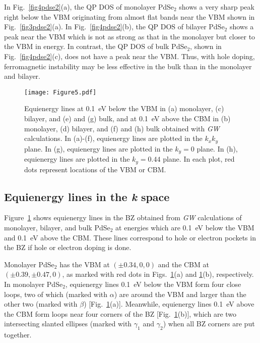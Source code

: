 \documentclass[aps,prb,longbibliography,twocolumn]{revtex4-2}
\begin{document}
In Fig.~\ref{fig4pdse2}(a), the QP DOS of monolayer PdSe$_2$ shows a very sharp peak 
right below the VBM originating from almost flat bands near the VBM shown in Fig.~\ref{fig3pdse2}(a).
In Fig.~\ref{fig4pdse2}(b), the QP DOS of bilayer PdSe$_2$ shows a peak near the VBM which is not as
strong as that in the monolayer but closer to the VBM in energy.
In contrast, the QP DOS of bulk PdSe$_2$, shown in Fig.~\ref{fig4pdse2}(c), does not have a peak
near the VBM. Thus, with hole doping, ferromagnetic instability may be less 
effective in the bulk than in the monolayer and bilayer.


\begin{figure}
\texttt{[image: Figure5.pdf]}
\caption{\label{fig5pdse2}Equienergy lines at 0.1~eV below the VBM in (a) monolayer, 
(c) bilayer, and (e) and (g) bulk, and at 0.1~eV above the CBM
in (b) monolayer, (d) bilayer, and (f) and (h) bulk
obtained with {\em GW} calculations.
In (a)-(f), equienergy lines are plotted in the $k_xk_y$ plane.
In (g), equienergy lines are plotted in the $k_y = 0$ plane.
In (h), equienergy lines are plotted in the $k_y = 0.44$ plane.
In each plot, red dots represent locations of the VBM or CBM.}
\end{figure}

\subsection{Equienergy lines in the {\em k} space}


Figure~\ref{fig5pdse2} shows equienergy lines in the BZ obtained from {\em GW} calculations of monolayer, 
bilayer, and bulk PdSe$_2$ at energies which are 0.1~eV below 
the VBM and 0.1~eV above the CBM.
These lines correspond to hole or electron pockets in the BZ if hole or electron 
doping is done.


Monolayer PdSe$_2$ has the VBM at $(\pm0.34,0,0)$ and 
the CBM at $(\pm0.39,\pm0.47,0)$, as marked with red dots
in Figs.~\ref{fig5pdse2}(a) and \ref{fig5pdse2}(b), respectively.
In monolayer PdSe$_2$, equienergy lines 0.1~eV below the VBM form four close loops,
two of which (marked with $\alpha$) are around the VBM and larger than the other 
two (marked with $\beta$) [Fig.~\ref{fig5pdse2}(a)].
Meanwhile, equienergy lines 0.1~eV above the CBM form loops near four corners of the BZ [Fig.~\ref{fig5pdse2}(b)],
which are two intersecting slanted ellipses (marked with $\gamma_1$ and $\gamma_2$)
when all BZ corners are put together.
\end{document}
